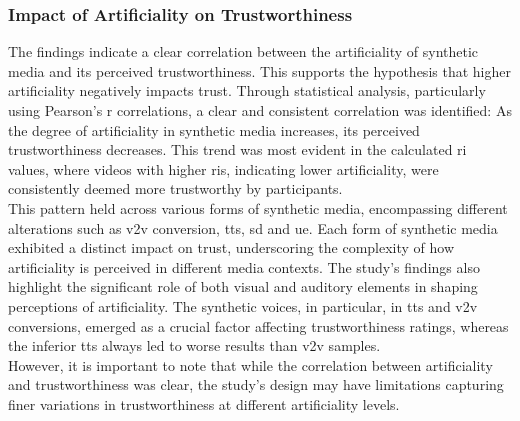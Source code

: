 \documentclass[
  a4paper,  %
  twoside,  %
  bibliography=totoc,
  headsepline,
  cleardoublepage=empty,
  parskip=half,
  draft=false
]{scrbook}
\begin{document}
\subsubsection{Impact of Artificiality on Trustworthiness}
The findings indicate a clear correlation between the artificiality of synthetic media and its perceived trustworthiness. This supports the hypothesis that higher artificiality negatively impacts trust. Through statistical analysis, particularly using Pearson's r correlations, a clear and consistent correlation was identified: As the degree of artificiality in synthetic media increases, its perceived trustworthiness decreases. This trend was most evident in the calculated \gls{ri} values, where videos with higher \gls{ri}s, indicating lower artificiality, were consistently deemed more trustworthy by participants. \\
This pattern held across various forms of synthetic media, encompassing different alterations such as \gls{v2v} conversion, \gls{tts}, \gls{sd} and \gls{ue}. Each form of synthetic media exhibited a distinct impact on trust, underscoring the complexity of how artificiality is perceived in different media contexts. The study's findings also highlight the significant role of both visual and auditory elements in shaping perceptions of artificiality. The synthetic voices, in particular, in \gls{tts} and \gls{v2v} conversions, emerged as a crucial factor affecting trustworthiness ratings, whereas the inferior \gls{tts} always led to worse results than \gls{v2v} samples. \\
However, it is important to note that while the correlation between artificiality and trustworthiness was clear, the study's design may have limitations capturing finer variations in trustworthiness at different artificiality levels.
\end{document}
